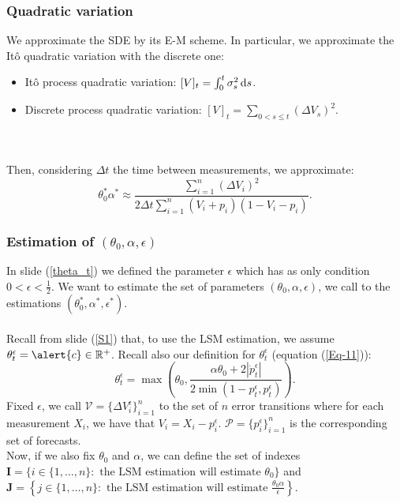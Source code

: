 \documentclass[aspectratio=169]{beamer}\usepackage[utf8]{inputenc}
\newcommand{\R}{\mathbb{R}}
\begin{document}
\begin{frame}\frametitle{Quadratic variation}\label{QV}

We approximate the SDE by its E-M scheme. In particular, we approximate the It\^o quadratic variation with the discrete one:
\begin{itemize}

\item It\^o process quadratic variation: $[V]_t=\int_0^t\sigma_s^2\dif s$.
\item Discrete process quadratic variation: $[V]_t=\sum_{0<s\leq t}(\Delta V_s)^2$.

\end{itemize}
\quad\\
\quad\\
Then, considering $\Delta t$ the time between measurements, we approximate:
\begin{equation}
\theta_0^*\alpha^*\approx\frac{\sum_{i=1}^n(\Delta V_i)^2}{2\Delta t\sum_{i=1}^n(V_i+p_i)(1-V_i-p_i)}.
\label{Eq-2}
\end{equation}

\end{frame}


\begin{frame}\frametitle{Estimation of $(\theta_0,\alpha,\epsilon)$}

In slide ({\color{blue}\ref{theta_t}}) we defined the parameter $\epsilon$ which has as only condition $0<\epsilon<\frac{1}{2}$. We want to estimate the set of parameters $(\theta_0,\alpha,\epsilon)$, we call to the estimations $(\theta_0^*,\alpha^*,\epsilon^*)$.\\
\quad\\
Recall from slide ({\color{blue}\ref{S1}}) that, to use the LSM estimation, we assume $\theta_t^\epsilon=\alert{c}\in\R^+$. Recall also our definition for $\theta_t^\epsilon$ (equation ({\color{blue}\ref{Eq-11}})):
\begin{equation*}
\theta_t^\epsilon=\max\left(\theta_0,\frac{\alpha\theta_0+2|\dot{p}_t^\epsilon|}{2\min(1-p_t^\epsilon,p_t^\epsilon)}\right).
\end{equation*}
Fixed $\epsilon$, we call $\mathcal{V}=\{\Delta V_i^\epsilon\}_{i=1}^n$ to the set of $n$ error transitions where for each measurement $X_i$, we have that $V_i=X_i-p_i^\epsilon$. $\mathcal{P}=\{p_i^\epsilon\}_{i=1}^n$ is the corresponding set of forecasts.\\
Now, if we also fix $\theta_0$ and $\alpha$, we can define the set of indexes $\mathbf{I}=\{i\in\{1,\dots,n\}:\text{ the LSM estimation will estimate }\theta_0\}$ and $\mathbf{J}=\left\{j\in\{1,\dots,n\}:\text{ the LSM estimation will estimate }\frac{\theta_0\alpha}{\epsilon}\right\}$.

\end{frame}
\end{document}
